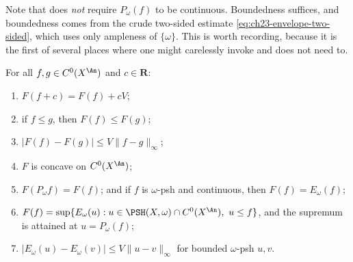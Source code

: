 Note that  does \emph{not} require
$P_\omega(f)$ to be continuous.  Boundedness suffices, and boundedness
comes from the crude two-sided estimate \eqref{eq:ch23-envelope-two-sided},
which uses only ampleness of $\{\omega\}$.  This is worth recording,
because it is the first of several places where one might carelessly invoke
 and does not need to.

\begin{proposition}
\label{prop:ch27-F-elementary}
For all $f,g\in C^0(X^{\An})$ and $c\in\mathbf R$:
\begin{enumerate}
\item $F(f+c)=F(f)+cV$;
\item if $f\leq g$, then $F(f)\leq F(g)$;
\item $|F(f)-F(g)|\leq V\lVert f-g\rVert_\infty$;
\item $F$ is concave on $C^0(X^{\An})$;
\item $F(P_\omega f)=F(f)$; and if $f$ is $\omega$-psh and continuous,
      then $F(f)=E_\omega(f)$;
\item $F(f)=\sup\{E_\omega(u): u\in\PSH(X,\omega)\cap C^0(X^{\An}),\
      u\leq f\}$, and the supremum is attained at $u=P_\omega(f)$;
\item $|E_\omega(u)-E_\omega(v)|\leq V\lVert u-v\rVert_\infty$ for
      bounded $\omega$-psh $u,v$.
\end{enumerate}
\end{proposition}

